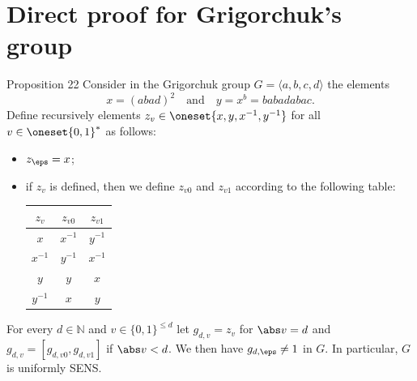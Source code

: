 \section*{Direct proof for Grigorchuk's group}
\begin{authorclaim}{Proposition 22}
  Consider in the Grigorchuk group $G=\langle a,b,c,d\rangle$ the elements
  \[x = (abad)^2\quad \text{and} \quad y = x^b = babadabac.\]
  Define recursively elements $z_v\in\oneset{x,y,x^{-1},y^{-1}}$ for all
  $v\in\oneset{0,1}^*$ as follows:
  \begin{itemize}
  \item $z_\eps = x$;
  \item if $z_v$ is defined, then we define $z_{v0}$ and $z_{v1}$ according to the following table:
   \medskip
  \begin{center}
    \begin{tabular}{|c|c|c|}
      $z_v$ & $z_{v0}$ & $z_{v1}$ \\ \hline 
            $x$ & $x^{-1}$   & $y^{-1}$  \\ \hline
   $x^{-1}$ & $y^{-1}$ & $x^{-1}$  \\ \hline
          $y$ & $y$ & $x$ \\ \hline
  $y^{-1}$ & $x$ & $y$  
   \end{tabular}
 \end{center}
 \medskip
  \end{itemize}
  For every $d\in\mathbb N$  and $v \in \{0,1\}^{\le d}$ let 
  $g_{d,v} = z_v$ for $\abs v = d$ and $g_{d,v} = [g_{d,v0},g_{d,v1}]$ if $\abs v<d$.
  We then have $g_{d,\eps} \neq 1$ in $G$.
  In particular, $G$ is uniformly SENS.
\end{authorclaim}
 
